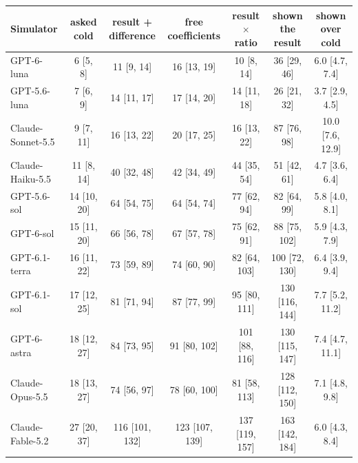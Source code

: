 \begin{table}[h]
\centering\small
\setlength{\tabcolsep}{5pt}
\begin{tabular}{lcccccc}
\toprule
Simulator & asked cold & result + difference & free coefficients & result $\times$ ratio & shown the result & shown over cold \\
\midrule
GPT-6-luna & 6 {\scriptsize[5, 8]} & 11 {\scriptsize[9, 14]} & 16 {\scriptsize[13, 19]} & 10 {\scriptsize[8, 14]} & 36 {\scriptsize[29, 46]} & 6.0 {\scriptsize[4.7, 7.4]} \\
GPT-5.6-luna & 7 {\scriptsize[6, 9]} & 14 {\scriptsize[11, 17]} & 17 {\scriptsize[14, 20]} & 14 {\scriptsize[11, 18]} & 26 {\scriptsize[21, 32]} & 3.7 {\scriptsize[2.9, 4.5]} \\
Claude-Sonnet-5.5 & 9 {\scriptsize[7, 11]} & 16 {\scriptsize[13, 22]} & 20 {\scriptsize[17, 25]} & 16 {\scriptsize[13, 22]} & 87 {\scriptsize[76, 98]} & 10.0 {\scriptsize[7.6, 12.9]} \\
Claude-Haiku-5.5 & 11 {\scriptsize[8, 14]} & 40 {\scriptsize[32, 48]} & 42 {\scriptsize[34, 49]} & 44 {\scriptsize[35, 54]} & 51 {\scriptsize[42, 61]} & 4.7 {\scriptsize[3.6, 6.4]} \\
GPT-5.6-sol & 14 {\scriptsize[10, 20]} & 64 {\scriptsize[54, 75]} & 64 {\scriptsize[54, 74]} & 77 {\scriptsize[62, 94]} & 82 {\scriptsize[64, 99]} & 5.8 {\scriptsize[4.0, 8.1]} \\
GPT-6-sol & 15 {\scriptsize[11, 20]} & 66 {\scriptsize[56, 78]} & 67 {\scriptsize[57, 78]} & 75 {\scriptsize[62, 91]} & 88 {\scriptsize[75, 102]} & 5.9 {\scriptsize[4.3, 7.9]} \\
GPT-6.1-terra & 16 {\scriptsize[11, 22]} & 73 {\scriptsize[59, 89]} & 74 {\scriptsize[60, 90]} & 82 {\scriptsize[64, 103]} & 100 {\scriptsize[72, 130]} & 6.4 {\scriptsize[3.9, 9.4]} \\
GPT-6.1-sol & 17 {\scriptsize[12, 25]} & 81 {\scriptsize[71, 94]} & 87 {\scriptsize[77, 99]} & 95 {\scriptsize[80, 111]} & 130 {\scriptsize[116, 144]} & 7.7 {\scriptsize[5.2, 11.2]} \\
GPT-6-astra & 18 {\scriptsize[12, 27]} & 84 {\scriptsize[73, 95]} & 91 {\scriptsize[80, 102]} & 101 {\scriptsize[88, 116]} & 130 {\scriptsize[115, 147]} & 7.4 {\scriptsize[4.7, 11.1]} \\
Claude-Opus-5.5 & 18 {\scriptsize[13, 27]} & 74 {\scriptsize[56, 97]} & 78 {\scriptsize[60, 100]} & 81 {\scriptsize[58, 113]} & 128 {\scriptsize[112, 150]} & 7.1 {\scriptsize[4.8, 9.8]} \\
Claude-Fable-5.2 & 27 {\scriptsize[20, 37]} & 116 {\scriptsize[101, 132]} & 123 {\scriptsize[107, 139]} & 137 {\scriptsize[119, 157]} & 163 {\scriptsize[142, 184]} & 6.0 {\scriptsize[4.3, 8.4]} \\

\end{tabular}
\end{table}
